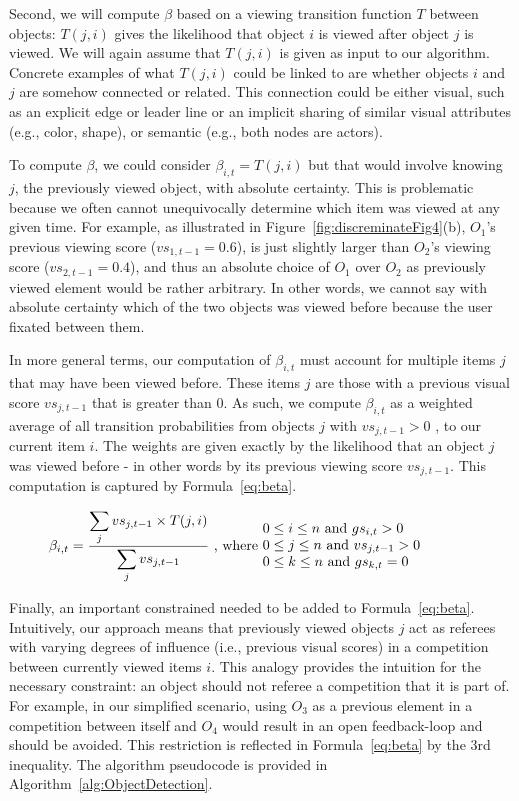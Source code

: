 Second, we will compute $\beta$ based on a viewing transition function $T$ between objects:  $T(j,i)$ gives the likelihood that object $i$ is viewed after object $j$ is viewed. We will again assume that $T(j,i)$ is given as input to our algorithm. Concrete examples of what $T(j,i)$ could be linked to are whether objects $i$ and $j$ are somehow connected or related. This connection could be either visual, such as an explicit edge or leader line or an implicit sharing of similar visual attributes (e.g., color, shape), or semantic (e.g., both nodes are actors). 

To compute $\beta$, we could consider $\beta_{i,t} = T(j,i)$ but that would involve knowing $j$, the previously viewed object, with absolute certainty. This is problematic because we often cannot unequivocally determine which item was viewed at any given time. For example, as illustrated in Figure~\ref{fig:discreminateFig4}(b), $O_1$'s previous viewing score ($vs_{1,t-1}=0.6$), is just slightly larger than $O_2$'s viewing score ($vs_{2,t-1}=0.4$), and thus an absolute choice of $O_1$ over $O_2$ as previously viewed element would be rather arbitrary.  In other words, we cannot say with absolute certainty which of the two objects was viewed before because the user fixated between them. 

In more general terms, our computation of $\beta_{i,t}$ must account for multiple items $j$ that may have been viewed before. These items $j$ are those with a previous visual score $vs_{j,t-1}$ that is greater than $0$.  As such, we compute $\beta_{i,t}$ as a weighted average of all transition probabilities from objects $j$ with $vs_{j,t-1} > 0$ , to our current item $i$. The weights are given exactly by the likelihood that an object $j$ was viewed before - in other words by its previous viewing score $vs_{j,t-1}$. This computation is captured by Formula~\ref{eq:beta}.  

\begin{equation}
\beta_{i,t} = \frac{\displaystyle\sum_{j} {vs_{j,t-1} \times T(j,i)}}{\displaystyle\sum_{j} vs_{j,t-1}} \text{ , where  } \parbox{15em}{$0\leq i \leq n$ and $gs_{i,t} > 0$\\$0\leq j \leq n$ and $vs_{j,t-1} > 0 $\\ $0\leq k \leq n$ and $gs_{k,t} = 0$ }
\label{eq:beta}
\end{equation} 

Finally, an important constrained needed to be added to Formula~\ref{eq:beta}. Intuitively, our approach means that previously viewed objects $j$ act as referees with varying degrees of influence (i.e., previous visual scores) in a competition between currently viewed items $i$. This analogy provides the intuition for the necessary constraint: an object should not referee a competition that it is part of. For example, in our simplified scenario, using $O_3$ as a previous element in a competition between itself and $O_4$ would result in an open feedback-loop and should be avoided. This restriction is reflected in Formula~\ref{eq:beta} by the 3rd inequality.  The algorithm pseudocode is provided in Algorithm~\ref{alg:ObjectDetection}.

